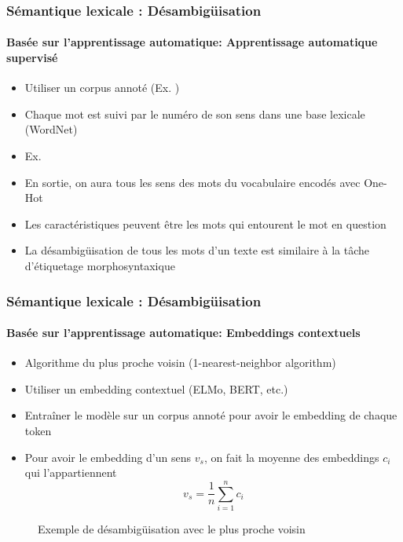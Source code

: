 \documentclass[xcolor=table]{beamer}
\begin{document}
\begin{frame}
\frametitle{Sémantique lexicale : Désambigüisation}
\framesubtitle{Basée sur l'apprentissage automatique: Apprentissage automatique supervisé}
	
\begin{itemize}
	\item Utiliser un corpus annoté (Ex. )
	\item Chaque mot est suivi par le numéro de son sens dans une base lexicale (WordNet)
	\item Ex. 
	\item En sortie, on aura tous les sens des mots du vocabulaire encodés avec One-Hot
	\item Les caractéristiques peuvent être les mots qui entourent le mot en question
	\item La désambigüisation de tous les mots d'un texte est similaire à la tâche d'étiquetage morphosyntaxique
\end{itemize}
	
\end{frame}

\begin{frame}
\frametitle{Sémantique lexicale : Désambigüisation}
\framesubtitle{Basée sur l'apprentissage automatique: Embeddings contextuels}

\begin{minipage}{.68\textwidth}
\begin{itemize}
	\item Algorithme du plus proche voisin (1-nearest-neighbor algorithm) 
	\item Utiliser un embedding contextuel (ELMo, BERT, etc.)
	\item Entraîner le modèle sur un corpus annoté pour avoir le embedding de chaque token
	\item Pour avoir le embedding d'un sens $v_s$, on fait la moyenne des embeddings $c_i$ qui l'appartiennent
	\[ v_s = \frac{1}{n} \sum_{i=1}^{n} c_i \] 
\end{itemize}
\end{minipage}
\begin{minipage}{.3\textwidth}
	\begin{figure}
		\caption{Exemple de désambigüisation avec le plus proche voisin \cite{2019-jurafsky-martin}}
	\end{figure}
\end{minipage}

\end{frame}

\end{document}

